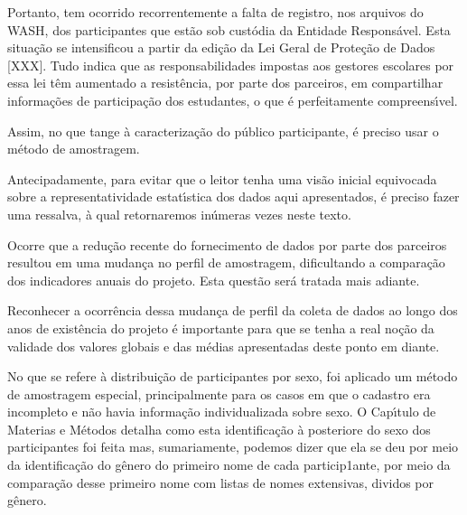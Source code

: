 \documentclass[
12pt,		%
openright,	%
twoside,  %
a4paper,			%
chapter=TITLE,		%
english,			%
french,				%
spanish,			%
brazil				%
]{USPSC-classe/USPSC_RedarTex}
\begin{document}
Portanto, tem ocorrido recorrentemente a falta de registro, nos arquivos do WASH, dos participantes que est\~ao sob cust\'odia da Entidade Respons\'avel. Esta situa\c{c}\~ao se intensificou a partir da edi\c{c}\~ao da Lei Geral de Prote\c{c}\~ao de Dados [XXX]. Tudo indica que as responsabilidades impostas aos gestores escolares por essa lei t\^em aumentado a  resist\^encia, por parte dos parceiros, em compartilhar informa\c{c}\~oes de participa\c{c}\~ao dos estudantes, o que \'e perfeitamente compreens\'{\i}vel.








Assim, no que tange \`a caracteriza\c{c}\~ao do p\'ublico participante, \'e preciso usar o m\'etodo de amostragem.








Antecipadamente, para evitar que o leitor tenha uma vis\~ao inicial equivocada sobre a representatividade estat\'{\i}stica dos dados aqui apresentados, \'e preciso fazer uma ressalva, \`a qual retornaremos in\'umeras vezes neste texto.








Ocorre que a redu\c{c}\~ao recente do fornecimento de dados por parte dos parceiros resultou em uma mudan\c{c}a no perfil de amostragem, dificultando a compara\c{c}\~ao dos indicadores anuais do projeto. Esta quest\~ao ser\'a tratada mais adiante.








Reconhecer a ocorr\^encia dessa mudan\c{c}a de perfil da coleta de dados ao longo dos anos de exist\^encia do projeto \'e importante para que se tenha a real no\c{c}\~ao da validade dos valores globais e das m\'edias apresentadas deste ponto em diante.








No que se refere \`a distribui\c{c}\~ao de participantes por sexo, foi aplicado um m\'etodo de amostragem especial, principalmente para os casos em que o cadastro era incompleto e n\~ao havia informa\c{c}\~ao individualizada sobre sexo. O Cap\'{\i}tulo de Materias e M\'etodos detalha como esta identifica\c{c}\~ao \`a posteriore do sexo dos participantes foi feita mas, sumariamente, podemos dizer que ela se deu por meio da identifica\c{c}\~ao do g\^enero do primeiro nome de cada particip1ante, por meio da compara\c{c}\~ao desse primeiro nome com listas de nomes extensivas, dividos por g\^enero.
\end{document}
